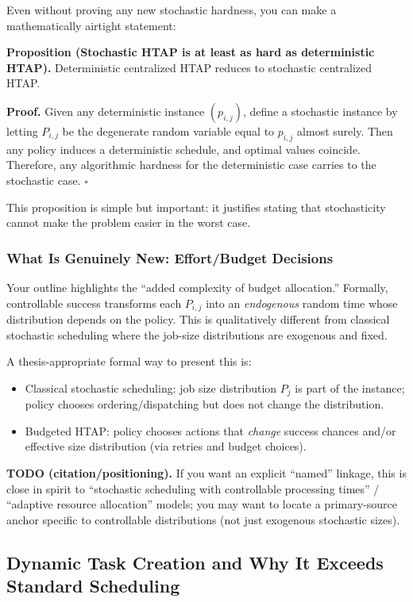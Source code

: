 Even without proving any new stochastic hardness, you can make a mathematically airtight statement:

\textbf{Proposition (Stochastic HTAP is at least as hard as deterministic HTAP).} Deterministic centralized HTAP reduces to stochastic centralized HTAP.

\textbf{Proof.} Given any deterministic instance \((p_{i,j})\), define a stochastic instance by letting \(P_{i,j}\) be the degenerate random variable equal to \(p_{i,j}\) almost surely. Then any policy induces a deterministic schedule, and optimal values coincide. Therefore, any algorithmic hardness for the deterministic case carries to the stochastic case. \(\square\)

This proposition is simple but important: it justifies stating that stochasticity cannot make the problem easier in the worst case.

\subsubsection{What Is Genuinely New: Effort/Budget Decisions}

Your outline highlights the ``added complexity of budget allocation.'' Formally, controllable success transforms each \(P_{i,j}\) into an \emph{endogenous} random time whose distribution depends on the policy. This is qualitatively different from classical stochastic scheduling where the job-size distributions are exogenous and fixed.

A thesis-appropriate formal way to present this is:

\begin{itemize}
\item Classical stochastic scheduling: job size distribution \(P_j\) is part of the instance; policy chooses ordering/dispatching but does not change the distribution.
\item Budgeted HTAP: policy chooses actions that \emph{change} success chances and/or effective size distribution (via retries and budget choices).
\end{itemize}

\textbf{TODO (citation/positioning).} If you want an explicit ``named'' linkage, this is close in spirit to ``stochastic scheduling with controllable processing times'' / ``adaptive resource allocation'' models; you may want to locate a primary-source anchor specific to controllable distributions (not just exogenous stochastic sizes).

\subsection{Dynamic Task Creation and Why It Exceeds Standard Scheduling}

